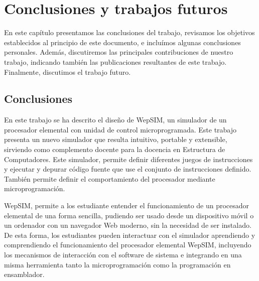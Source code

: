 \chead[]{}
\renewcommand{\headrulewidth}{0.5pt}

\lfoot[]{}
\cfoot[]{}
\rfoot[]{}
\renewcommand{\footrulewidth}{0pt}

\chapter{Conclusiones y trabajos futuros}
\label{ch:conclusions_and_future_work}

En este capítulo presentamos las conclusiones del trabajo, revisamos los objetivos establecidos al principio de este documento, e incluímos algunas conclusiones personales. Además, discutiremos las principales contribuciones de nuestro trabajo, indicando también las publicaciones resultantes de este trabajo. Finalmente, discutimos el trabajo futuro.

\section{Conclusiones}

En este trabajo se ha descrito el diseño de WepSIM, un simulador de un procesador elemental con unidad de control microprogramada. Este trabajo presenta un nuevo simulador que resulta intuitivo, portable y extensible, sirviendo como complemento docente para la docencia en Estructura de Computadores. Este simulador, permite definir diferentes juegos de instrucciones y ejecutar y depurar código fuente que use el conjunto de instrucciones definido. También permite definir el comportamiento del procesador mediante microprogramación.

WepSIM, permite a los estudiante entender el funcionamiento de un procesador elemental de una forma sencilla, pudiendo ser usado desde un dispositivo móvil o un ordenador con un navegador Web moderno, sin la necesidad de ser instalado. De esta forma, los estudiantes pueden interactuar con el simulador aprendiendo y comprendiendo el funcionamiento del procesador elemental WepSIM, incluyendo los mecanismos de interacción con el software de sistema e integrando en una misma herramienta tanto la microprogramación como la programación en ensamblador.

